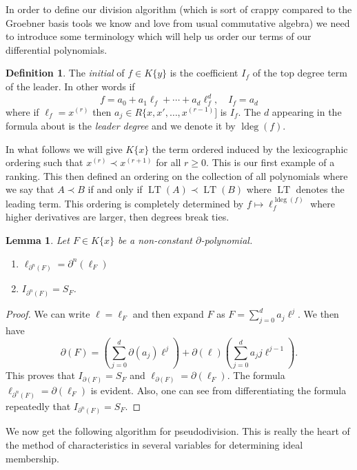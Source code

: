 \documentclass[12pt]{book}
\numberwithin{equation}{section}
\newtheorem{lemma}[theorem]{Lemma}
\theoremstyle{definition}
\newtheorem{definition}[theorem]{Definition}
\theoremstyle{remark}
\newcommand{\LT}{\operatorname{LT}}
\newcommand{\ldeg}{\operatorname{ldeg}}
\begin{document}
In order to define our division algorithm (which is sort of crappy compared to the Groebner basis tools we know and love from usual commutative algebra) we need to introduce some terminology which will help us order our terms of our differential polynomials.
\begin{definition}
	The \emph{initial} of $f \in K \lbrace y \rbrace$ is the coefficient $I_f$ of the top degree term of the leader.
	In other words if 
	$$ f = a_0 + a_1 \ell_f + \cdots + a_d \ell_f^d, \quad I_f = a_d $$
	where if $\ell_f = x^{(r)}$ then $a_j \in R\lbrace x,x',\ldots,x^{(r-1)}]$ is $I_f$. 
	The $d$ appearing in the formula about is the \emph{leader degree} and we denote it by $\ldeg(f)$.
\end{definition}

In what follows we will give $K\lbrace x \rbrace$ the term ordered induced by the lexicographic ordering such that $x^{(r)} \prec x^{(r+1)}$ for all $r\geq 0$. 
This is our first example of a ranking. 
This then defined an ordering on the collection of all polynomials where we say that $A\prec B$ if and only if $\LT(A)\prec\LT(B)$ where $\LT$ denotes the leading term.
This ordering is completely determined by $f\mapsto \ell_f^{\ldeg(f)}$ where higher derivatives are larger, then degrees break ties. 



\begin{lemma}
	Let $F \in K\lbrace x \rbrace$ be a non-constant $\partial$-polynomial. 
	\begin{enumerate}[topsep=0pt]
		\item $\ell_{\partial^n(F)} = \partial^n(\ell_F)$
		\item $I_{\partial^n(F)} = S_F$.
	\end{enumerate}
\end{lemma}
\begin{proof}
	We can write $\ell=\ell_F$ and then expand $F$ as $ F = \sum_{j=0}^d a_j \ell^j$.
	We then have 
	 $$ \partial(F) = \left( \sum_{j=0}^d \partial(a_j) \ell^j\right) + \partial(\ell) \left( \sum_{j=0}^d a_j j \ell^{j-1} \right ). $$
	This proves that $I_{\partial(F)} = S_F$ and $\ell_{\partial(F)} = \partial(\ell_F)$.
	The formula $\ell_{\partial^n(F)}=\partial(\ell_F)$ is evident. 
	Also, one can see from differentiating the formula repeatedly that $I_{\partial^n(F)} = S_F$. 
\end{proof}

We now get the following algorithm for pseudodivision. 
This is really the heart of the method of characteristics in several variables for determining ideal membership. 
\end{document}

